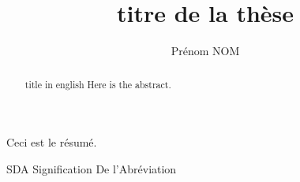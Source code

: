 \documentclass [memoire, letterpaper, oneside, fleqn,12pt]{thETS-utf8}
\title{titre de la thèse}
\author{Prénom NOM}
\begin{document}

\maketitle

\presentjury

\begin{avantpropos}

\end{avantpropos}

\begin{remerciements}

\end{remerciements}

\begin{sommaire}
Ceci est le résumé.
\end{sommaire} 


\begin{abstract}{title in english}
Here is the abstract.
\end{abstract}


\tableofcontents

\listoftables

\listoffigures

\begin{listofabbr}[3cm]
\item[SDA] Signification De l'Abréviation
\end{listofabbr}
\end{document}
